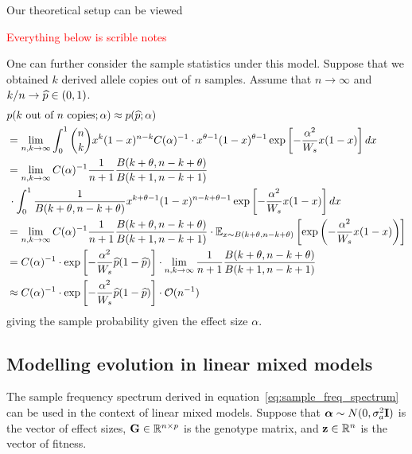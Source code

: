 \documentclass[10pt]{article}
\begin{document}
Our theoretical setup can be viewed






\newpage


\textcolor{red}{Everything below is scrible notes}




One can further consider the sample statistics under this model.
Suppose that we obtained $k$ derived allele copies out of $n$ samples.
Assume that $n \rightarrow \infty$ and $k/n \rightarrow \hp \in (0,1)$.
\begin{align} \label{eq:sample_freq_spectrum}
    \begin{aligned}
        &p(\text{$k$ out of $n$ copies}; \alpha) \approx p(\hp; \alpha)  \\
        &= \lim_{n,k \rightarrow \infty}
        \int_0^1 \binom{n}{k} x^{k} (1-x)^{n-k}
        C(\alpha)^{-1} \cdot
     x^{\theta-1}(1-x)^{\theta-1} 
     \exp\left[-\frac{\alpha^2}{W_s}x(1-x) \right] dx\\
     &= \lim_{n,k \rightarrow \infty} 
     C(\alpha)^{-1} \frac{1}{n+1}
     \frac{B(k+\theta, n-k + \theta)}{B(k+1,n-k+1)} \\
     &\,\cdot\int_0^1 \frac{1}{B(k+\theta,n-k+\theta)} x^{k+\theta-1}(1-x)^{n-k+\theta-1}
     \exp\left[-\frac{\alpha^2}{W_s}x(1-x)\right] dx \\
     &= \lim_{n,k \rightarrow \infty}
     C(\alpha)^{-1} \frac{1}{n+1}
     \frac{B(k+\theta, n-k + \theta)}{B(k+1,n-k+1)}
     \cdot \E[x \sim B(k+\theta,n-k+\theta)]{
        \exp\left(-\frac{\alpha^2}{W_s}x(1-x)\right)
     } \\
     &= C(\alpha)^{-1} \cdot 
     \exp\left[-\frac{\alpha^2}{W_s}\hp(1-\hp)\right]
     \cdot \lim_{n,k \rightarrow \infty} 
     \frac{1}{n+1}
     \frac{B(k+\theta, n-k + \theta)}{B(k+1,n-k+1)} \\
     &\approx C(\alpha)^{-1} \cdot 
     \exp\left[-\frac{\alpha^2}{W_s}\hp(1-\hp)\right]
     \cdot \mathcal{O}(n^{-1})
    \end{aligned}
\end{align}
giving the sample probability given the effect size $\alpha$.

\subsection{Modelling evolution in linear mixed models}
The sample frequency spectrum derived in equation~\ref{eq:sample_freq_spectrum} can be used in the context of linear mixed models.
Suppose that $\balpha \sim N(0, \sigma_a^2\bI)$ is the vector of effect sizes,
$\bG \in \real^{n \times p}$ is the genotype matrix, and $\bz \in \real^n$ is the vector of fitness.
\end{document}

